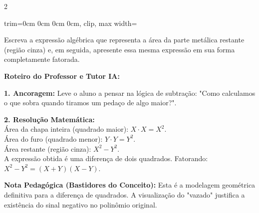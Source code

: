 \begin{multicols*}{2}
\begin{enunciadoLiteral}
\begin{center}
\begin{adjustbox}{trim=0cm 0cm 0cm 0cm, clip, max width=\larguraTikz}
\end{adjustbox}
\end{center}

Escreva a expressão algébrica que representa a área da parte metálica restante (região cinza) e, em seguida, apresente essa mesma expressão em sua forma completamente fatorada.
\end{enunciadoLiteral}

\ifgabarito
    \begin{tcolorbox}[colback=CorTitUm!5, colframe=CorTitUm, boxrule=1pt, arc=4pt, left=6pt, right=6pt, top=6pt, bottom=6pt]
    \small\textbf{\textcolor{CorTitUm}{Roteiro do Professor e Tutor IA:}}\par\vspace{0.1cm}
    \color{CinzaEscuro}
    \textbf{1. Ancoragem:} Leve o aluno a pensar na lógica de subtração: "Como calculamos o que sobra quando tiramos um pedaço de algo maior?".\par\vspace{0.1cm}
    \textbf{2. Resolução Matemática:}\\
    Área da chapa inteira (quadrado maior): $X \cdot X = X^2$.\\
    Área do furo (quadrado menor): $Y \cdot Y = Y^2$.\\
    Área restante (região cinza): $X^2 - Y^2$.\\
    A expressão obtida é uma diferença de dois quadrados. Fatorando:\\
    $X^2 - Y^2 = (X + Y)(X - Y)$.
    \end{tcolorbox}
    \vspace{0.15cm}
    
    \begin{boxexplicacao}
    \textbf{Nota Pedagógica (Bastidores do Conceito):} Esta é a modelagem geométrica definitiva para a diferença de quadrados. A visualização do "vazado" justifica a existência do sinal negativo no polinômio original.
    \end{boxexplicacao}
\fi


\end{multicols*}
